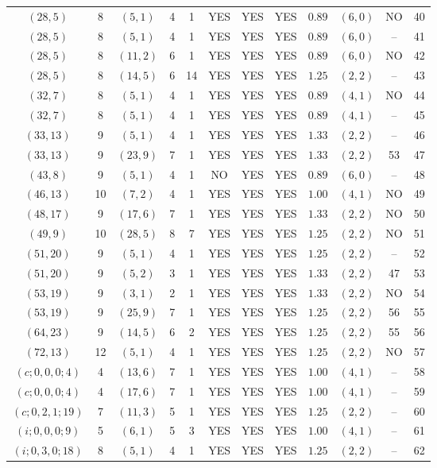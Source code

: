 \begin{longtable}{|c|c|c|c|c|c|c|c|c|c|c|c|}
$(28,5)$ & 8 & $(5,1)$ & 4 & 1 & YES & YES & YES & $0.89$ & $(6,0)$ & NO & 40\\
$(28,5)$ & 8 & $(5,1)$ & 4 & 1 & YES & YES & YES & $0.89$ & $(6,0)$ & -- & 41\\
$(28,5)$ & 8 & $(11,2)$ & 6 & 1 & YES & YES & YES & $0.89$ & $(6,0)$ & NO & 42\\
$(28,5)$ & 8 & $(14,5)$ & 6 & 14 & YES & YES & YES & $1.25$ & $(2,2)$ & -- & 43\\
$(32,7)$ & 8 & $(5,1)$ & 4 & 1 & YES & YES & YES & $0.89$ & $(4,1)$ & NO & 44\\
$(32,7)$ & 8 & $(5,1)$ & 4 & 1 & YES & YES & YES & $0.89$ & $(4,1)$ & -- & 45\\
$(33,13)$ & 9 & $(5,1)$ & 4 & 1 & YES & YES & YES & $1.33$ & $(2,2)$ & -- & 46\\
$(33,13)$ & 9 & $(23,9)$ & 7 & 1 & YES & YES & YES & $1.33$ & $(2,2)$ & 53 & 47\\
$(43,8)$ & 9 & $(5,1)$ & 4 & 1 & NO & YES & YES & $0.89$ & $(6,0)$ & -- & 48\\
$(46,13)$ & 10 & $(7,2)$ & 4 & 1 & YES & YES & YES & $1.00$ & $(4,1)$ & NO & 49\\
$(48,17)$ & 9 & $(17,6)$ & 7 & 1 & YES & YES & YES & $1.33$ & $(2,2)$ & NO & 50\\
$(49,9)$ & 10 & $(28,5)$ & 8 & 7 & YES & YES & YES & $1.25$ & $(2,2)$ & NO & 51\\
$(51,20)$ & 9 & $(5,1)$ & 4 & 1 & YES & YES & YES & $1.25$ & $(2,2)$ & -- & 52\\
$(51,20)$ & 9 & $(5,2)$ & 3 & 1 & YES & YES & YES & $1.33$ & $(2,2)$ & 47 & 53\\
$(53,19)$ & 9 & $(3,1)$ & 2 & 1 & YES & YES & YES & $1.33$ & $(2,2)$ & NO & 54\\
$(53,19)$ & 9 & $(25,9)$ & 7 & 1 & YES & YES & YES & $1.25$ & $(2,2)$ & 56 & 55\\
$(64,23)$ & 9 & $(14,5)$ & 6 & 2 & YES & YES & YES & $1.25$ & $(2,2)$ & 55 & 56\\
$(72,13)$ & 12 & $(5,1)$ & 4 & 1 & YES & YES & YES & $1.25$ & $(2,2)$ & NO & 57\\
$(c;0,0,0;4)$ & 4 & $(13,6)$ & 7 & 1 & YES & YES & YES & $1.00$ & $(4,1)$ & -- & 58\\
$(c;0,0,0;4)$ & 4 & $(17,6)$ & 7 & 1 & YES & YES & YES & $1.00$ & $(4,1)$ & -- & 59\\
$(c;0,2,1;19)$ & 7 & $(11,3)$ & 5 & 1 & YES & YES & YES & $1.25$ & $(2,2)$ & -- & 60\\
$(i;0,0,0;9)$ & 5 & $(6,1)$ & 5 & 3 & YES & YES & YES & $1.00$ & $(4,1)$ & -- & 61\\
$(i;0,3,0;18)$ & 8 & $(5,1)$ & 4 & 1 & YES & YES & YES & $1.25$ & $(2,2)$ & -- & 62
\end{longtable}
